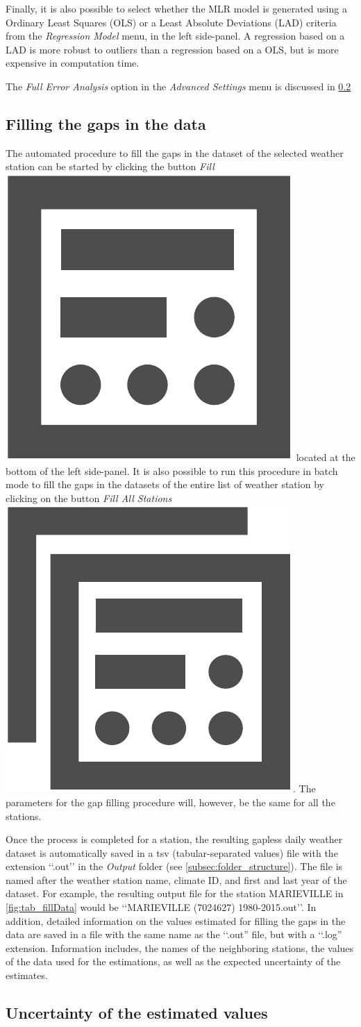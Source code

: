 \documentclass[WHATMANUAL.tex]{subfiles}
\begin{document}
Finally, it is also possible to select whether the MLR model is generated using a Ordinary Least Squares (OLS) or a Least Absolute Deviations (LAD) criteria from the \emph{Regression Model} menu, in the left side-panel. A regression based on a LAD is more robust to outliers than a regression based on a OLS, but is more expensive in computation time.

The \emph{Full Error Analysis} option in the \emph{Advanced Settings} menu is discussed in \cref{subsec:uncertainty}

\subsection{Filling the gaps in the data}\label{subsec:filling_the_gaps}

The automated procedure to fill the gaps in the dataset of the selected weather station can be started by clicking the button \emph{Fill}~{\includegraphics[height=2ex]{img/fill_data}} located at the bottom of the left side-panel. It is also possible to run this procedure in batch mode to fill the gaps in the datasets of the entire list of weather station by clicking on the button \emph{Fill All Stations}~{\includegraphics[height=2ex]{img/fill_all_data}}. The parameters for the gap filling procedure will, however, be the same for all the stations.

Once the process is completed for a station, the resulting gapless daily weather dataset is automatically saved in a tsv (tabular-separated values) file with the extension ‘‘.out’’ in the \emph{Output} folder (see \cref{subsec:folder_structure}). The file is named after the weather station name, climate ID, and first and last year of the dataset. For example, the resulting output file for the station MARIEVILLE in \cref{fig:tab_fillData} would be ‘‘MARIEVILLE (7024627) 1980-2015.out’’.  In addition, detailed information on the values estimated for filling the gaps in the data are saved in a file with the same name as the ‘‘.out'' file, but with a ‘‘.log'' extension. Information includes, the names of the neighboring stations, the values of the data used for the estimations, as well as the expected uncertainty of the estimates.

\subsection{Uncertainty of the estimated values}\label{subsec:uncertainty}
\end{document}
